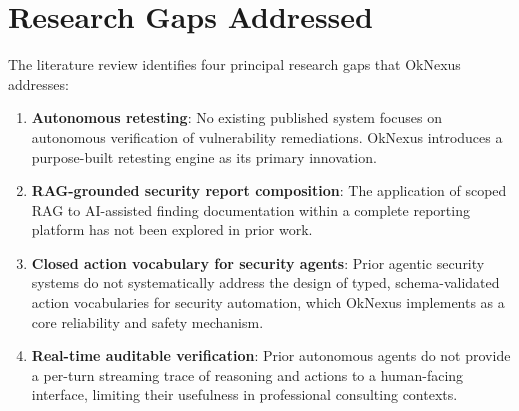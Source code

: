 \section{Research Gaps Addressed}

The literature review identifies four principal research gaps that OkNexus addresses:

\begin{enumerate}
    \item \textbf{Autonomous retesting}: No existing published system focuses on autonomous verification of vulnerability remediations. OkNexus introduces a purpose-built retesting engine as its primary innovation.

    \item \textbf{RAG-grounded security report composition}: The application of scoped RAG to AI-assisted finding documentation within a complete reporting platform has not been explored in prior work.

    \item \textbf{Closed action vocabulary for security agents}: Prior agentic security systems do not systematically address the design of typed, schema-validated action vocabularies for security automation, which OkNexus implements as a core reliability and safety mechanism.

    \item \textbf{Real-time auditable verification}: Prior autonomous agents do not provide a per-turn streaming trace of reasoning and actions to a human-facing interface, limiting their usefulness in professional consulting contexts.
\end{enumerate}
